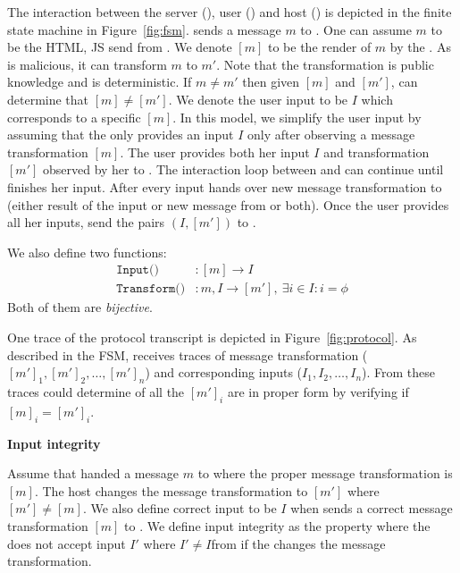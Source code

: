 The interaction between the server (\server), user (\user) and host (\host) is depicted in the finite state machine in Figure~\ref{fig:fsm}. \server sends a message $m$ to \host. One can assume $m$ to be the HTML, JS send from \server. We denote $[m]$ to be the render of $m$ by the \host. As \host is malicious, it can transform $m$ to $m'$. Note that the transformation is public knowledge and is deterministic. If $m\neq m'$ then given $[m]$ and $[m']$, \server can determine that $[m]\neq [m']$. We denote the user input to be $I$ which corresponds to a specific $[m]$. 
In this model, we simplify the user input by assuming that the \user only provides an input $I$ only after observing a message transformation $[m]$. The user provides both her input $I$ and transformation $[m']$ observed by her to \host. The interaction loop between \host and \user can continue until \user finishes her input. After every input \host hands over new message transformation to \user (either result of the input or new message from \server or both). Once the user provides all her inputs, \host send the pairs $(I, [m'])$ to \server.

We also define two functions:
\begin{align*}
\texttt{Input()}&:[m]\rightarrow I \\
\texttt{Transform()}&:m,I\rightarrow [m'],\ \exists i\in I:i=\phi
\end{align*}
Both of them are \emph{bijective}.

One trace of the protocol transcript is depicted in Figure~\ref{fig:protocol}. As described in the FSM, \server receives traces of message transformation ($[m']_1,[m']_2,\ldots,[m']_n$) and corresponding inputs ($I_1,I_2,\ldots,I_n$). From these traces \server could determine of all the $[m']_i$ are in proper form by verifying if $[m]_i=[m']_i$.

\begin{definition}{\textbf{Input integrity}}
\label{def:inputIntegrity}

Assume that \server handed a message $m$ to \host where the proper message transformation is $[m]$. The host changes the message transformation to $[m']$ where $[m']\neq [m]$. We also define correct \user input to be $I$ when \host sends a correct message transformation $[m]$ to \user. We define input integrity as the property where the \server does not accept input $I'$ where $I'\neq I$from \user if the \host changes the message transformation.
\end{definition}

